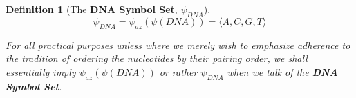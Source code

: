 \documentclass[a4paper, 18pt]{book} %
\newtheorem{defn}{Definition}
\begin{document}
{\begin{minipage}{0.9\textwidth}
\begin{defn}[The \textbf{DNA Symbol Set}, $\psi_{DNA}$]
\vspace{1em}

\begin{equation}
\label{EQDNASS}
\psi_{DNA} = \psi_{az}(\psi(DNA)) = \langle A, C, G, T\rangle
\end{equation}

\vspace{1em}

For all practical purposes unless where we merely wish to emphasize adherence to the tradition of ordering the nucleotides by their pairing order, we shall essentially imply $\psi_{az}(\psi(DNA))$ or rather $\psi_{DNA}$ when we talk of the \textbf{DNA Symbol Set}.

\end{defn}

\end{minipage}}
\\
\end{document}
